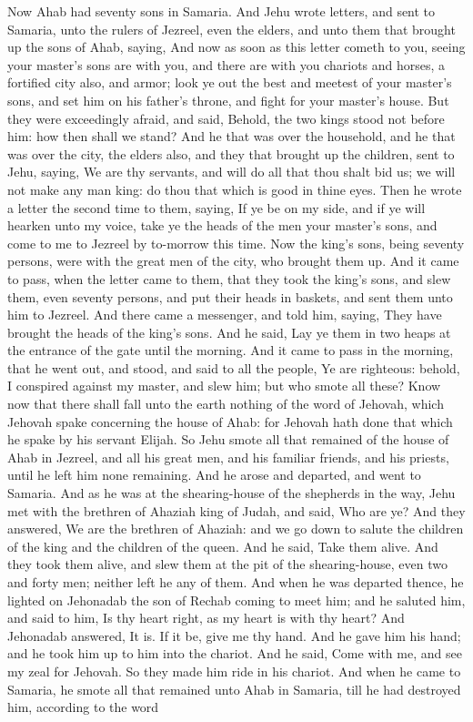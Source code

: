 Now Ahab had seventy sons in Samaria. And Jehu wrote letters, and sent to Samaria, unto the rulers of Jezreel, even the elders, and unto them that brought up the sons of Ahab, saying, And now as soon as this letter cometh to you, seeing your master’s sons are with you, and there are with you chariots and horses, a fortified city also, and armor; look ye out the best and meetest of your master’s sons, and set him on his father’s throne, and fight for your master’s house. But they were exceedingly afraid, and said, Behold, the two kings stood not before him: how then shall we stand? And he that was over the household, and he that was over the city, the elders also, and they that brought up the children, sent to Jehu, saying, We are thy servants, and will do all that thou shalt bid us; we will not make any man king: do thou that which is good in thine eyes. Then he wrote a letter the second time to them, saying, If ye be on my side, and if ye will hearken unto my voice, take ye the heads of the men your master’s sons, and come to me to Jezreel by to-morrow this time. Now the king’s sons, being seventy persons, were with the great men of the city, who brought them up. And it came to pass, when the letter came to them, that they took the king’s sons, and slew them, even seventy persons, and put their heads in baskets, and sent them unto him to Jezreel. And there came a messenger, and told him, saying, They have brought the heads of the king’s sons. And he said, Lay ye them in two heaps at the entrance of the gate until the morning. And it came to pass in the morning, that he went out, and stood, and said to all the people, Ye are righteous: behold, I conspired against my master, and slew him; but who smote all these? Know now that there shall fall unto the earth nothing of the word of Jehovah, which Jehovah spake concerning the house of Ahab: for Jehovah hath done that which he spake by his servant Elijah. So Jehu smote all that remained of the house of Ahab in Jezreel, and all his great men, and his familiar friends, and his priests, until he left him none remaining.  And he arose and departed, and went to Samaria. And as he was at the shearing-house of the shepherds in the way, Jehu met with the brethren of Ahaziah king of Judah, and said, Who are ye? And they answered, We are the brethren of Ahaziah: and we go down to salute the children of the king and the children of the queen. And he said, Take them alive. And they took them alive, and slew them at the pit of the shearing-house, even two and forty men; neither left he any of them.  And when he was departed thence, he lighted on Jehonadab the son of Rechab coming to meet him; and he saluted him, and said to him, Is thy heart right, as my heart is with thy heart? And Jehonadab answered, It is. If it be, give me thy hand. And he gave him his hand; and he took him up to him into the chariot. And he said, Come with me, and see my zeal for Jehovah. So they made him ride in his chariot. And when he came to Samaria, he smote all that remained unto Ahab in Samaria, till he had destroyed him, according to the word 